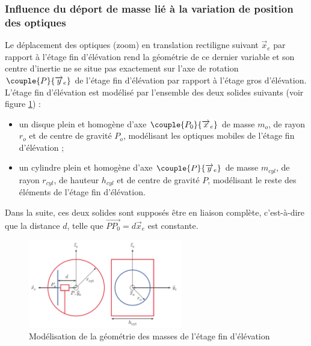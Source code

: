 \FloatBarrier
\subsubsection{Influence du déport de masse lié à la variation de position des optiques}

Le déplacement des optiques (zoom) en translation rectiligne suivant $\overrightarrow{x}_e$ par rapport à l'étage fin d'élévation
rend la géométrie de ce dernier variable et son centre d'inertie ne se situe pas exactement sur l'axe de rotation
$\couple{P}{\overrightarrow{y}_e}$ de l'étage fin d'élévation par rapport à l'étage gros d'élévation.
L'étage fin d'élévation est modélisé par l'ensemble des deux solides suivants (voir figure \ref{figure12}) :
\begin{itemize}
\item un disque plein et homogène d'axe $\couple{P_0}{\overrightarrow{x}_e}$ de masse $m_o$, de rayon $r_o$ et de centre de gravité $P_o$, modélisant les optiques mobiles de l'étage fin d'élévation ;
\item un cylindre plein et homogène d'axe $\couple{P}{\overrightarrow{y}_e}$ de masse $m_{cyl}$, de rayon $r_{cyl}$, de hauteur $h_{cyl}$ et de centre de gravité $P$, modélisant le reste des éléments de l'étage fin d'élévation.
\end{itemize}

Dans la suite, ces deux solides sont supposés être en liaison complète, c'est-à-dire que la distance $d$, telle que $\overrightarrow{PP_0}=d\overrightarrow{x}_e$ est constante.

\begin{figure}[!htb]
\begin{center}
\includegraphics[width=0.6\textwidth]{images/figure12.jpg}
\caption{Modélisation de la géométrie des masses de l'étage fin d'élévation \label{figure12}}
\end{center}
\end{figure}

